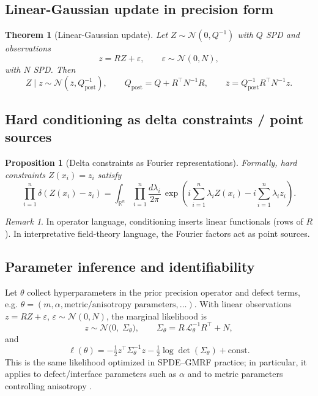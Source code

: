 \documentclass[11pt]{article}
\theoremstyle{definition}
\theoremstyle{plain}
\newtheorem{theorem}{Theorem}[section]
\newtheorem{proposition}{Proposition}[section]
\theoremstyle{remark}
\newtheorem{remark}{Remark}[section]
\newcommand{\R}{\mathbb{R}}
\begin{document}
\subsection{Linear-Gaussian update in precision form}

\begin{theorem}[Linear-Gaussian update]\label{thm:linupdate}
Let $Z\sim\mathcal{N}(0,Q^{-1})$ with $Q$ SPD and observations
\[
z=RZ+\varepsilon,\qquad \varepsilon\sim\mathcal{N}(0,N),
\]
with $N$ SPD. Then
\[
Z\mid z\sim\mathcal{N}(\bar z,Q_{\mathrm{post}}^{-1}),\qquad
Q_{\mathrm{post}}=Q+R^\top N^{-1}R,\qquad
\bar z=Q_{\mathrm{post}}^{-1}R^\top N^{-1}z.
\]
\end{theorem}

\subsection{Hard conditioning as delta constraints / point sources}

\begin{proposition}[Delta constraints as Fourier representations]\label{prop:vertex}
Formally, hard constraints $Z(x_i)=z_i$ satisfy
\[
\prod_{i=1}^n\delta(Z(x_i)-z_i)
=
\int_{\R^n}\prod_{i=1}^n\frac{d\lambda_i}{2\pi}\,
\exp\!\left(i\sum_{i=1}^n\lambda_i Z(x_i)-i\sum_{i=1}^n\lambda_i z_i\right).
\]
\end{proposition}

\begin{remark}
In operator language, conditioning inserts linear functionals (rows of $R$). In interpretative field-theory language, the Fourier factors act as point sources.
\end{remark}

\subsection{Parameter inference and identifiability}\label{sec:inference}

Let $\theta$ collect hyperparameters in the prior precision operator and defect terms, e.g.
$\theta=(m,\alpha,\text{metric/anisotropy parameters},\ldots)$.
With linear observations $z=RZ+\varepsilon$, $\varepsilon\sim\mathcal{N}(0,N)$, the marginal likelihood is
\[
z \sim \mathcal{N}\bigl(0,\; \Sigma_\theta\bigr), \qquad
\Sigma_\theta = R\,\mathcal{L}_\theta^{-1}R^\top + N,
\]
and
\[
\ell(\theta) = -\tfrac12 z^\top \Sigma_\theta^{-1}z - \tfrac12\log\det(\Sigma_\theta) + \text{const}.
\]
This is the same likelihood optimized in SPDE--GMRF practice; in particular, it applies to defect/interface parameters such as $\alpha$
and to metric parameters controlling anisotropy \citep{LindgrenRueLindstrom2011,LindgrenBolinRue2022}.
\end{document}
